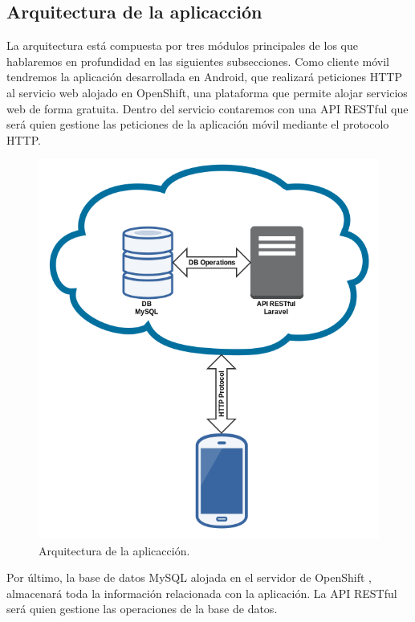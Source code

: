   \subsection{Arquitectura de la aplicacción}
  
La arquitectura está compuesta por tres módulos principales de los que hablaremos en profundidad en las siguientes subsecciones. Como cliente móvil tendremos la aplicación desarrollada en Android, que realizará peticiones HTTP al servicio web alojado en OpenShift, una plataforma que permite alojar servicios web de forma gratuita. Dentro del servicio contaremos con una API RESTful que será quien gestione las peticiones de la aplicación móvil mediante el protocolo HTTP.

	\begin{figure}[H]
      \centering
	\includegraphics[keepaspectratio, scale=0.4]{Media/Captures/architecture.png}
      \caption{Arquitectura de la aplicacción.}
      \label{fig:architecture}
    \end{figure}

Por último, la base de datos MySQL alojada en el servidor de OpenShift \cite{ref:OpenShift}, almacenará toda la información relacionada con la aplicación. La API RESTful será quien gestione las operaciones de la base de datos.

